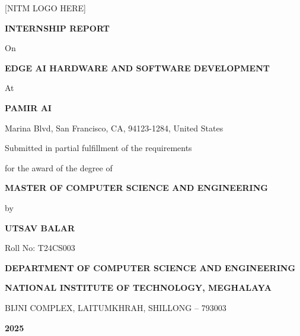 \documentclass[12pt,a4paper]{report}
\begin{document}

\begin{titlepage}
    \centering

    \vspace*{1cm}

    {\Large [NITM LOGO HERE]}

    \vspace{1.5cm}

    {\LARGE\bfseries INTERNSHIP REPORT}

    \vspace{1cm}

    {\Large On}

    \vspace{0.5cm}

    {\LARGE\bfseries EDGE AI HARDWARE AND SOFTWARE DEVELOPMENT}

    \vspace{1cm}

    {\Large At}

    \vspace{0.5cm}

    {\LARGE\bfseries PAMIR AI}

    \vspace{0.3cm}

    {\large Marina Blvd, San Francisco, CA, 94123-1284, United States}

    \vspace{1.5cm}

    {\large Submitted in partial fulfillment of the requirements}

    {\large for the award of the degree of}

    \vspace{0.5cm}

    {\Large\bfseries MASTER OF COMPUTER SCIENCE AND ENGINEERING}

    \vspace{1cm}

    {\large by}

    \vspace{0.5cm}

    {\Large\bfseries UTSAV BALAR}

    {\large Roll No: T24CS003}

    \vfill

    {\large\bfseries DEPARTMENT OF COMPUTER SCIENCE AND ENGINEERING}

    {\large\bfseries NATIONAL INSTITUTE OF TECHNOLOGY, MEGHALAYA}

    {\large BIJNI COMPLEX, LAITUMKHRAH, SHILLONG -- 793003}

    \vspace{0.5cm}

    {\large\bfseries 2025}

\end{titlepage}
\end{document}
